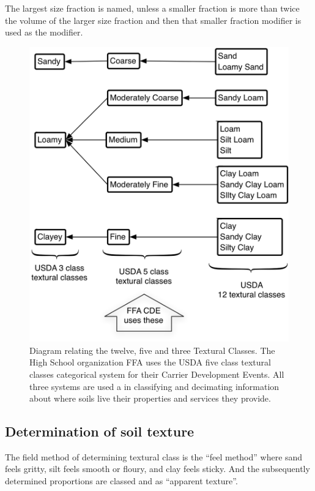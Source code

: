 \documentclass[letterpaper, 12pt]{article}
\begin{document}
The largest size fraction is named, unless a smaller fraction is more than twice the volume of the larger size fraction and then that smaller fraction modifier is used as the modifier.

\begin{figure}
    \includegraphics[width=0.9\columnwidth]{images/Textural_Classes_bw-25pct.png}
    \caption{Diagram relating the twelve, five and three  Textural Classes. The High School organization FFA uses the USDA five class textural classes categorical system for their Carrier Development Events. All three systems are used a in classifying and decimating information about where soils live their properties and services they provide.}
    \label{fig:TextureClass12-5-3}
\end{figure}


    
\subsection{Determination of soil texture}

The field method of determining textural class is the \enquote{feel method} where sand feels gritty, silt feels smooth or floury, and clay feels sticky. And the subsequently determined proportions are classed and as \enquote{apparent texture}.
\end{document}
